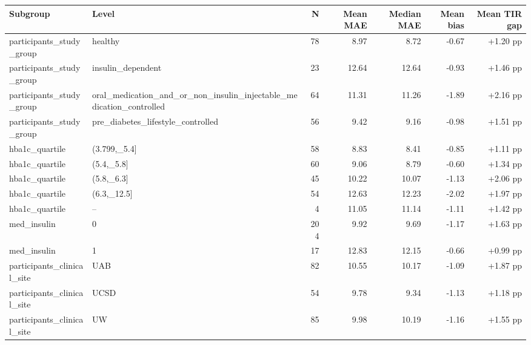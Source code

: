 \begin{tabular}{llrrrrr}
\toprule
Subgroup & Level & N & Mean MAE & Median MAE & Mean bias & Mean TIR gap \\
\midrule
participants\_study\_group & healthy & 78 & 8.97 & 8.72 & -0.67 & +1.20 pp \\
participants\_study\_group & insulin\_dependent & 23 & 12.64 & 12.64 & -0.93 & +1.46 pp \\
participants\_study\_group & oral\_medication\_and\_or\_non\_insulin\_injectable\_medication\_controlled & 64 & 11.31 & 11.26 & -1.89 & +2.16 pp \\
participants\_study\_group & pre\_diabetes\_lifestyle\_controlled & 56 & 9.42 & 9.16 & -0.98 & +1.51 pp \\
hba1c\_quartile & (3.799,\_5.4] & 58 & 8.83 & 8.41 & -0.85 & +1.11 pp \\
hba1c\_quartile & (5.4,\_5.8] & 60 & 9.06 & 8.79 & -0.60 & +1.34 pp \\
hba1c\_quartile & (5.8,\_6.3] & 45 & 10.22 & 10.07 & -1.13 & +2.06 pp \\
hba1c\_quartile & (6.3,\_12.5] & 54 & 12.63 & 12.23 & -2.02 & +1.97 pp \\
hba1c\_quartile & -- & 4 & 11.05 & 11.14 & -1.11 & +1.42 pp \\
med\_insulin & 0 & 204 & 9.92 & 9.69 & -1.17 & +1.63 pp \\
med\_insulin & 1 & 17 & 12.83 & 12.15 & -0.66 & +0.99 pp \\
participants\_clinical\_site & UAB & 82 & 10.55 & 10.17 & -1.09 & +1.87 pp \\
participants\_clinical\_site & UCSD & 54 & 9.78 & 9.34 & -1.13 & +1.18 pp \\
participants\_clinical\_site & UW & 85 & 9.98 & 10.19 & -1.16 & +1.55 pp \\
\bottomrule
\end{tabular}
